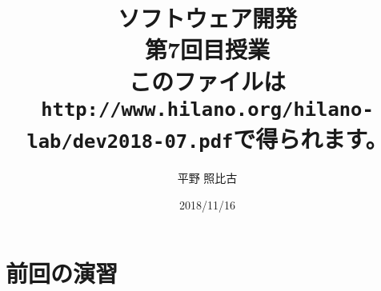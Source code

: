 
\title[ソフトウェア開発\\第7回目授業]
{ソフトウェア開発\\第7回目授業\\ {\small このファイルは
\texttt{http://www.hilano.org/hilano-lab/dev2018-07.pdf}で得られます。}}
\author{平野 照比古}
\institute{}
\date{2018/11/16}
\newtheorem{Prob}{解説}

\frame{\maketitle}
\newcommand{\Elm}[1]{\texttt{<#1>}}
\section{前回の演習}
